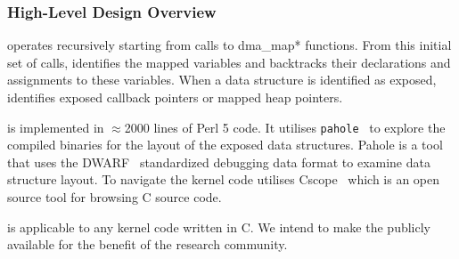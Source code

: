 


\subsubsection{High-Level Design Overview}

\tool operates recursively starting from calls to dma\_map* functions. From this initial set of calls, \tool identifies the mapped variables and backtracks their declarations and assignments to these variables. When a data structure is identified as exposed, \tool identifies exposed callback pointers or mapped heap pointers. 



\tool is implemented in $\approx$2000 lines of Perl 5 code. It utilises \texttt{pahole}~\cite{dwarves} to explore the compiled binaries for the layout of the exposed data structures. Pahole is a tool that uses the DWARF~\cite{dwarf} standardized debugging data format to examine data structure layout. To navigate the kernel code \tool utilises Cscope~\cite{cscope,cscope_92} which is an open source tool for browsing C source code.

\tool is applicable to any kernel code written in C. We intend to make the \tool publicly available for the benefit of the research community.


